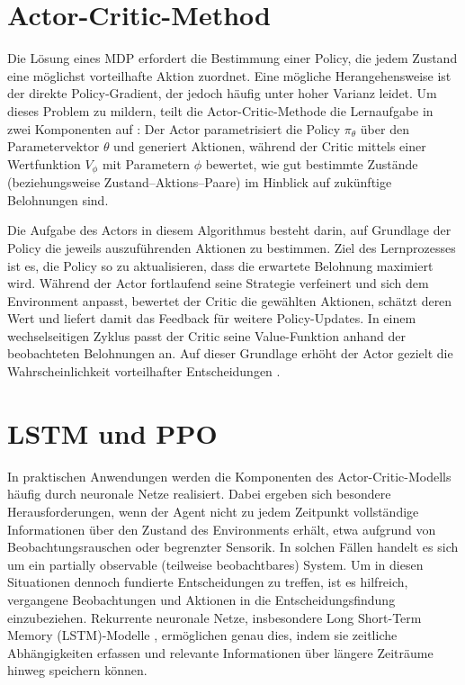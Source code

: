 \section{Actor-Critic-Method}
Die Lösung eines MDP erfordert die Bestimmung einer Policy, die jedem Zustand eine möglichst vorteilhafte Aktion zuordnet. Eine mögliche Herangehensweise ist der direkte Policy‐Gradient, der jedoch häufig unter hoher Varianz leidet. Um dieses Problem zu mildern, teilt die Actor-Critic-Methode die Lernaufgabe in zwei Komponenten auf \cite{konda2000ActorCritic}: Der Actor parametrisiert die Policy \(\pi_{\theta}\) über den Parametervektor \(\theta\) und generiert Aktionen, während der Critic mittels einer Wertfunktion \(V_{\phi}\) mit Parametern \(\phi\) bewertet, wie gut bestimmte Zustände (beziehungsweise Zustand–Aktions–Paare) im Hinblick auf zukünftige Belohnungen sind.

Die Aufgabe des Actors in diesem Algorithmus besteht darin, auf Grundlage der Policy die jeweils auszuführenden Aktionen zu bestimmen. Ziel des Lernprozesses ist es, die Policy so zu aktualisieren, dass die erwartete Belohnung maximiert wird. Während der Actor fortlaufend seine Strategie verfeinert und sich dem Environment anpasst, bewertet der Critic die gewählten Aktionen, schätzt deren Wert und liefert damit das Feedback für weitere Policy-Updates. In einem wechselseitigen Zyklus passt der Critic seine Value-Funktion anhand der beobachteten Belohnungen an. Auf dieser Grundlage erhöht der Actor gezielt die Wahrscheinlichkeit vorteilhafter Entscheidungen .

\section{LSTM und PPO}
In praktischen Anwendungen werden die Komponenten des Actor-Critic-Modells häufig durch neuronale Netze realisiert. Dabei ergeben sich besondere Herausforderungen, wenn der Agent nicht zu jedem Zeitpunkt vollständige Informationen über den Zustand des Environments erhält, etwa aufgrund von Beobachtungsrauschen oder begrenzter Sensorik. In solchen Fällen handelt es sich um ein partially observable (teilweise beobachtbares) System. Um in diesen Situationen dennoch fundierte Entscheidungen zu treffen, ist es hilfreich, vergangene Beobachtungen und Aktionen in die Entscheidungsfindung einzubeziehen. Rekurrente neuronale Netze, insbesondere Long Short-Term Memory (LSTM)-Modelle \cite{10.1162/neco.1997.9.8.1735}, ermöglichen genau dies, indem sie zeitliche Abhängigkeiten erfassen und relevante Informationen über längere Zeiträume hinweg speichern können. 

